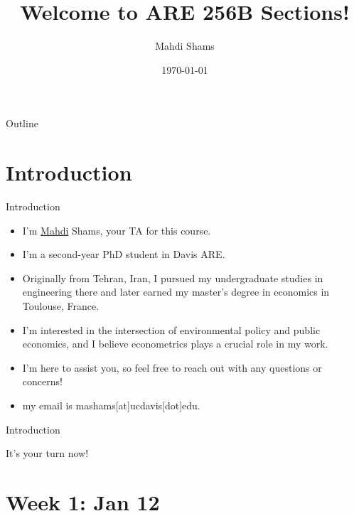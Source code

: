 \documentclass{beamer}
\title{Welcome to ARE 256B Sections!}
\author{Mahdi Shams}
\date{\today}
\begin{document}
\begin{frame}
    \titlepage 
\end{frame}


\begin{frame}{Outline}
    \tableofcontents
\end{frame}

\section{Introduction}

\begin{frame}{Introduction}
\begin{itemize}
    \item I'm \href{https://www.youtube.com/watch?v=J9wRl5TVFvc}{Mahdi} Shams,
     your TA for this course. 
    \item I'm a second-year PhD student in Davis ARE. 
    \item Originally from Tehran, Iran, I pursued my undergraduate studies in 
    engineering there and later earned my master's degree in economics in 
    Toulouse, France.
    \item I'm interested in the intersection of environmental policy and public 
    economics, and I believe econometrics plays a crucial role in my work. 
  
  
  \item I'm here to assist you, so feel free to reach out with any questions or 
    concerns!
 \item my email is mashams[at]ucdavis[dot]edu.
  
\end{itemize}
\end{frame}

\begin{frame}{Introduction}
\begin{center}
    \Huge It's your turn now!
    \end{center}
\end{frame} 

\section{Week 1: Jan 12}
\end{document}
